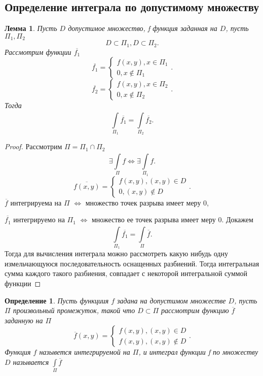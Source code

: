 \documentclass[14pt]{extarticle} \usepackage{fontspec}
\newtheorem{definition}{Определение}
\newtheorem{lemma}[theorem]{Лемма}
\begin{document}
\subsection{Определение интеграла по допустимому множеству}
\begin{lemma}
    Пусть $D$ допустимое множество, f функция заданная на  $D$, пусть  $\Pi_1,\Pi_2$
    \[
    D \subset \Pi_1, D\subset \Pi_2
    .\] 
    Рассмотрим функции $\overline{f_1}$
    \[
    \overline{f_1} = 
    \begin{cases}
        f(x,y), x \in \Pi_1\\
        0, x \notin \Pi_1
    \end{cases}
    .\] 
    \[
    \overline{f_2} = 
    \begin{cases}
        f(x,y) , x\in \Pi_2\\
        0, x \notin \Pi_2
    \end{cases}
    .\] 
    Тогда
    \[
    \int\limits_{\Pi_1}^{}  \overline{f_1} = \int\limits_{\Pi_2}^{}   \overline{f_2}
    .\] 
\end{lemma}
\begin{proof}
    Рассмотрим  $\Pi = \Pi_1 \cap \Pi_2$
    \[
    \exists  \int\limits_{\Pi}^{} f \iff \exists  \int\limits_{\Pi_1}^{}   f
    .\] 
    \[
    \overline{f(x,y)} = 
    \begin{cases}
        f(x,y), (x,y) \in D\\
        0 , (x,y) \notin D
    \end{cases}
    .\] 
    $\overline{f}$ интегрируема на $\Pi$  $\iff$ множество точек разрыва имеет меру 0,

     $\overline{f_1}$ интегрируемо на $\Pi_1$ $\iff$ множество ее точек разрыва имеет меру 0.
     Докажем
      \[
     \int\limits_{\Pi_1}^{} \overline{f_1}  = \int\limits_{\Pi}^{} \overline{f} 
     .\] 
     Тогда для вычисления интеграла можно рассмотреть какую нибудь одну измельчающуюся последовательность оснащенных разбиений. Тогда интегральная сумма каждого такого разбиения, совпадает с некоторой интегральной суммой функции
\end{proof}
\begin{definition}
    Пусть функциия $f$  задана на допустимом множестве  $D$, пусть  $\Pi$ произвольный промежуток, такой что  $D \subset \Pi$ рассмотрим функцию  $\overline{f}$ заданную на $\Pi$
     \[
    \overline{f}(x,y) = 
    \begin{cases}
        f(x,y) , (x,y) \in D \\
        f(x,y) , (x,y) \notin D
    \end{cases}
    .\] 
    Функция $f$ назывется интегрируемой на $\Pi$, и интеграл функции f по множеству  $D$ называется   $\int\limits_{\Pi}^{} \overline{f} $
\end{definition}
\end{document}
